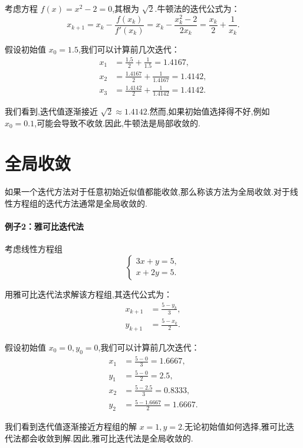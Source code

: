 考虑方程 $f(x) = x^2 - 2 = 0$,其根为 $\sqrt{2}$.牛顿法的迭代公式为：
\[
x_{k+1} = x_k - \frac{f(x_k)}{f'(x_k)} = x_k - \frac{x_k^2 - 2}{2x_k} = \frac{x_k}{2} + \frac{1}{x_k}.
\]

假设初始值 $x_0 = 1.5$,我们可以计算前几次迭代：
\[
\begin{aligned}
x_1 &= \frac{1.5}{2} + \frac{1}{1.5} = 1.4167, \\
x_2 &= \frac{1.4167}{2} + \frac{1}{1.4167} = 1.4142, \\
x_3 &= \frac{1.4142}{2} + \frac{1}{1.4142} = 1.4142.
\end{aligned}
\]

我们看到,迭代值逐渐接近 $\sqrt{2} \approx 1.4142$.然而,如果初始值选择得不好,例如 $x_0 = 0.1$,可能会导致不收敛.因此,牛顿法是局部收敛的.

\section*{全局收敛}

如果一个迭代方法对于任意初始近似值都能收敛,那么称该方法为全局收敛.对于线性方程组的迭代方法通常是全局收敛的.

\paragraph{例子2：雅可比迭代法}
考虑线性方程组
\[
\begin{cases}
3x + y = 5, \\
x + 2y = 5.
\end{cases}
\]

用雅可比迭代法求解该方程组,其迭代公式为：
\[
\begin{aligned}
x_{k+1} &= \frac{5 - y_k}{3}, \\
y_{k+1} &= \frac{5 - x_k}{2}.
\end{aligned}
\]

假设初始值 $x_0 = 0, y_0 = 0$,我们可以计算前几次迭代：
\[
\begin{aligned}
x_1 &= \frac{5 - 0}{3} = 1.6667, \\
y_1 &= \frac{5 - 0}{2} = 2.5, \\
x_2 &= \frac{5 - 2.5}{3} = 0.8333, \\
y_2 &= \frac{5 - 1.6667}{2} = 1.6667.
\end{aligned}
\]

我们看到迭代值逐渐接近方程组的解 $x = 1, y = 2$.无论初始值如何选择,雅可比迭代法都会收敛到解.因此,雅可比迭代法是全局收敛的.





